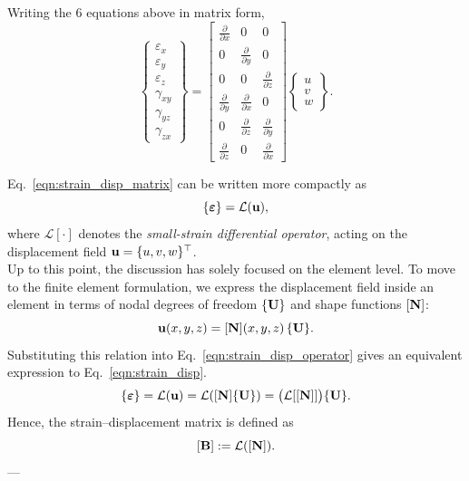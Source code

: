 \documentclass[12pt, a4paper]{article}
\numberwithin{equation}{section}
\begin{document}
Writing the 6 equations above in matrix form, 
\begin{equation}
\label{eqn:strain_disp_matrix}
    \begin{Bmatrix}
        \varepsilon_x \\
        \varepsilon_y \\
        \varepsilon_z \\
        \gamma_{xy} \\
        \gamma_{yz} \\
        \gamma_{zx}
    \end{Bmatrix}
    =
    \begin{bmatrix}
        \frac{\partial}{\partial x} & 0 & 0 \\[.5em]
        0 & \frac{\partial}{\partial y} & 0 \\[.5em]
        0 & 0 & \frac{\partial}{\partial z} \\[.5em]
        \frac{\partial}{\partial y} & \frac{\partial}{\partial x} & 0 \\[.5em]
        0 & \frac{\partial}{\partial z} & \frac{\partial}{\partial y} \\[.5em]
        \frac{\partial}{\partial z} & 0 & \frac{\partial}{\partial x}
    \end{bmatrix}
    \begin{Bmatrix}
        u \\
        v \\
        w
    \end{Bmatrix}.
\end{equation}

Eq.~\eqref{eqn:strain_disp_matrix} can be written more compactly as
\begin{equation}
\label{eqn:strain_disp_operator}
    \{\boldsymbol{\varepsilon}\} = \mathcal{L}(\mathbf{u}),
\end{equation}
where $\mathcal{L}[\cdot]$ denotes the \emph{small-strain differential operator}, acting on the displacement field $\mathbf{u} = \{u,v,w\}^\top$. \\

Up to this point, the discussion has solely focused on the element level. To move to the finite element formulation, we express the displacement field inside an element in terms of nodal degrees of freedom $\{\mathbf{U}\}$ and shape functions $[\mathbf{N}]$:
\begin{equation}
    \mathbf{u}(x,y,z) = [\mathbf{N}](x,y,z)\,\{\mathbf{U}\}.
\end{equation}
Substituting this relation into Eq.~\eqref{eqn:strain_disp_operator} gives an equivalent expression to Eq.~\eqref{eqn:strain_disp}.
\begin{equation}
    \{\boldsymbol{\varepsilon}\} = \mathcal{L} (\mathbf{u}) = \mathcal{L}([\mathbf{N}] \{\mathbf{U}\}) = \big(\mathcal{L}[[\mathbf{N}]]\big)\{\mathbf{U}\}.
\end{equation}
Hence, the strain–displacement matrix is defined as
\begin{equation}
    [\mathbf{B}] := \mathcal{L}([\mathbf{N}]).
\end{equation}
---
\end{document}
